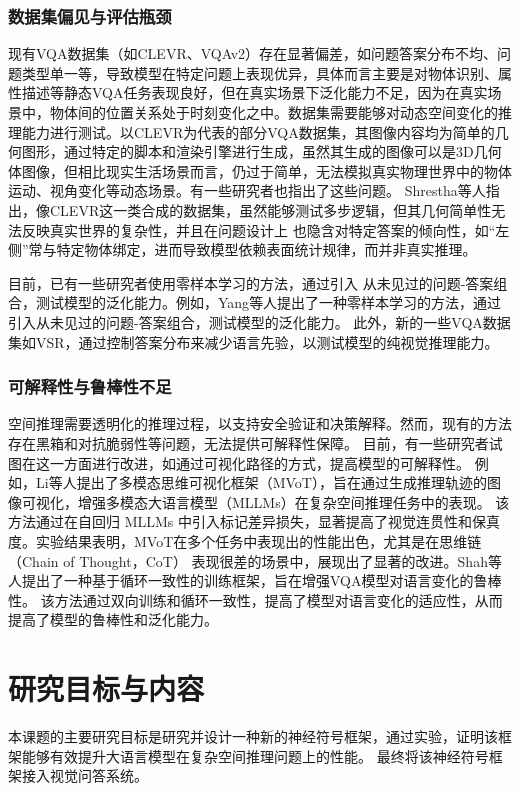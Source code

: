 \subsubsection{数据集偏见与评估瓶颈}
现有VQA数据集（如CLEVR、VQAv2）存在显著偏差，如问题答案分布不均、问题类型单一等，导致模型在特定问题上表现优异，具体而言主要是对物体识别、属性描述等静态VQA任务表现良好，但在真实场景下泛化能力不足，因为在真实场景中，物体间的位置关系处于时刻变化之中。数据集需要能够对动态空间变化的推理能力进行测试。以CLEVR为代表的部分VQA数据集，其图像内容均为简单的几何图形，通过特定的脚本和渲染引擎进行生成，虽然其生成的图像可以是3D几何体图像，但相比现实生活场景而言，仍过于简单，无法模拟真实物理世界中的物体运动、视角变化等动态场景。有一些研究者也指出了这些问题。
Shrestha\cite{shrestha2019answer}等人指出，像CLEVR这一类合成的数据集，虽然能够测试多步逻辑，但其几何简单性无法反映真实世界的复杂性，并且在问题设计上
也隐含对特定答案的倾向性，如“左侧”常与特定物体绑定，进而导致模型依赖表面统计规律，而并非真实推理。

目前，已有一些研究者使用零样本学习的方法，通过引入
从未见过的问题-答案组合，测试模型的泛化能力。例如，Yang\cite{yang-etal-2022-zero}等人提出了一种零样本学习的方法，通过引入从未见过的问题-答案组合，测试模型的泛化能力。
此外，新的一些VQA数据集如VSR，通过控制答案分布来减少语言先验，以测试模型的纯视觉推理能力。

\subsubsection{可解释性与鲁棒性不足}
空间推理需要透明化的推理过程，以支持安全验证和决策解释。然而，现有的方法存在黑箱和对抗脆弱性等问题，无法提供可解释性保障。
目前，有一些研究者试图在这一方面进行改进，如通过可视化路径的方式，提高模型的可解释性。
例如，Li\cite{li2025imagine}等人提出了多模态思维可视化框架（MVoT），旨在通过生成推理轨迹的图像可视化，增强多模态大语言模型（MLLMs）在复杂空间推理任务中的表现。
该方法通过在自回归 MLLMs 中引入标记差异损失，显著提高了视觉连贯性和保真度。实验结果表明，MVoT在多个任务中表现出的性能出色，尤其是在思维链（Chain of Thought，CoT）
表现很差的场景中，展现出了显著的改进。Shah\cite{shah2019cycle}等人提出了一种基于循环一致性的训练框架，旨在增强VQA模型对语言变化的鲁棒性。
该方法通过双向训练和循环一致性，提高了模型对语言变化的适应性，从而提高了模型的鲁棒性和泛化能力。

\section{研究目标与内容}
本课题的主要研究目标是研究并设计一种新的神经符号框架，通过实验，证明该框架能够有效提升大语言模型在复杂空间推理问题上的性能。
最终将该神经符号框架接入视觉问答系统。

